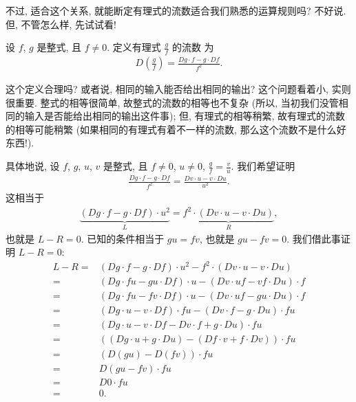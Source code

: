 不过, 适合这个关系, 就能断定有理式的流数适合我们熟悉的运算规则吗? 不好说. 但, 不管怎么样, 先试试看!

\begin{definition}
    设 $f$, $g$ 是整式, 且 $f \neq 0$. 定义有理式 $\frac{g}{f}$ 的流数  为
    \begin{align*}
        D \left( \frac{g}{f} \right) = \frac{Dg \cdot f - g \cdot Df}{f^2}.
    \end{align*}
\end{definition}

这个定义合理吗? 或者说, 相同的输入能否给出相同的输出? 这个问题看着小, 实则很重要. 整式的相等很简单, 故整式的流数的相等也不复杂 (所以, 当初我们没管相同的输入是否能给出相同的输出这件事); 但, 有理式的相等稍繁, 故有理式的流数的相等可能稍繁 (如果相同的有理式有着不一样的流数, 那么这个流数不是什么好东西!).

具体地说, 设 $f$, $g$, $u$, $v$ 是整式, 且 $f \neq 0$, $u \neq 0$, $\frac{g}{f} = \frac{v}{u}$. 我们希望证明
\begin{align*}
    \frac{Dg \cdot f - g \cdot Df}{f^2} = \frac{Dv \cdot u - v \cdot Du}{u^2}.
\end{align*}
这相当于
\begin{align*}
    \underbrace{(Dg \cdot f - g \cdot Df) \cdot u^2}_{L} = \underbrace{f^2 \cdot (Dv \cdot u - v \cdot Du)}_{R},
\end{align*}
也就是 $L - R = 0$. 已知的条件相当于 $gu = fv$, 也就是 $gu - fv = 0$. 我们借此事证明 $L - R = 0$:
\begin{align*}
    L - R
    = {} & (Dg \cdot f - g \cdot Df) \cdot u^2 - f^2 \cdot (Dv \cdot u - v \cdot Du) \\
    = {} & (Dg \cdot fu - gu \cdot Df) \cdot u - (Dv \cdot uf - vf \cdot Du) \cdot f \\
    = {} & (Dg \cdot fu - fv \cdot Df) \cdot u - (Dv \cdot uf - gu \cdot Du) \cdot f \\
    = {} & (Dg \cdot u - v \cdot Df) \cdot fu - (Dv \cdot f - g \cdot Du) \cdot fu   \\
    = {} & (Dg \cdot u - v \cdot Df - Dv \cdot f + g \cdot Du) \cdot fu              \\
    = {} & ((Dg \cdot u + g \cdot Du) - (Df \cdot v + f \cdot Dv)) \cdot fu          \\
    = {} & (D(gu) - D(fv)) \cdot fu                                                  \\
    = {} & D(gu - fv) \cdot fu                                                       \\
    = {} & D0 \cdot fu                                                               \\
    = {} & 0.
\end{align*}

